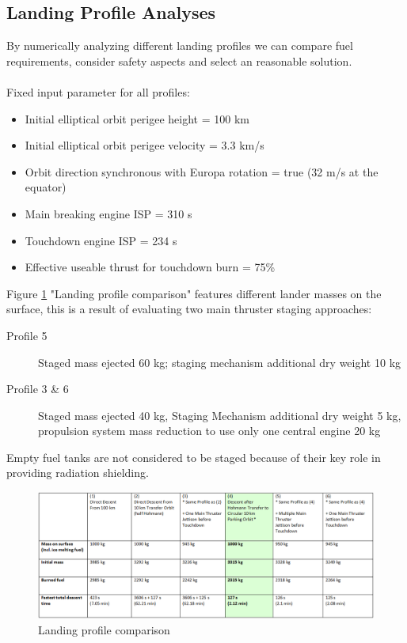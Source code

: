 \subsection{Landing Profile Analyses}\label{lapran}
By numerically analyzing different landing profiles we can compare fuel requirements, consider safety aspects and select an reasonable solution.\\
\\
Fixed input parameter for all profiles:
\begin{itemize} 
\item Initial elliptical orbit perigee height = 100 km
\item Initial elliptical orbit perigee velocity = 3.3 km/s
\item Orbit direction synchronous with Europa rotation = true (32 m/s at the equator)
\item Main breaking engine ISP = 310 s
\item Touchdown engine ISP = 234 s
\item Effective useable thrust for touchdown burn = 75\%
\end{itemize}

Figure \ref{fig:acomparison} "Landing profile comparison" features different lander masses on the surface, this is a result of evaluating two main thruster staging approaches: 
\begin{description}
\item [Profile 5] Staged mass ejected 60 kg; staging mechanism additional dry weight 10 kg
\item [Profile 3 \& 6] Staged mass ejected 40 kg, Staging Mechanism additional dry weight 5 kg, propulsion system mass reduction to use only one central engine 20 kg
\end{description}

Empty fuel tanks are not considered to be staged because of their key role in providing radiation shielding.

\begin{figure}[htb]
	\centering
	\includegraphics[width=\textwidth]{Lander/aaroncomparison}
	\caption{Landing profile comparison\label{fig:acomparison}}
\end{figure}


